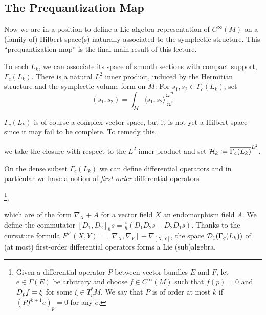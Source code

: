 \documentclass[parskip=half]{scrartcl}
\begin{document}
\subsection{The Prequantization Map}

Now we are in a position to define a Lie algebra representation of $C^\infty(M)$ on a (family of) Hilbert space(s) naturally associated to the symplectic structure. This ``prequantization map'' is the final main result of this lecture. \begin{onboard}
To each $L_k$, we can associate its space of smooth sections with compact support, $\Gamma_c(L_k)$. There is a natural $L^2$ inner product, induced by the Hermitian structure and the symplectic volume form on $M$: For $s_1,s_2\in\Gamma_c(L_k)$, set
\begin{equation*}
	(s_1,s_2)=\int_M \langle s_1,s_2\rangle \frac{\omega^n}{n!}
\end{equation*}
\end{onboard}
$\Gamma_c(L_k)$ is of course a complex vector space, but it is not yet a Hilbert space since it may fail to be complete. To remedy this, 
\begin{onboard}
we take the closure with respect to the $L^2$-inner product and set $\mathcal{H}_k\coloneqq \overline{\Gamma_c(L_k)}^{L^2}$.
	
On the dense subset $\Gamma_c(L_k)$ we can define differential operators and in particular we have a notion of \emph{first order} differential operators
\end{onboard} 
\footnote{Given a differential operator $P$ between vector bundles $E$ and $F$, let $e\in \Gamma(E)$ be arbitrary and choose $f\in C^\infty(M)$ such that $f(p)=0$ and $D_p f=\xi$ for some $\xi\in T^*_pM$. We say that $P$ is of order at most $k$ if $(P f^{k+1}e)_p= 0$ for any $e$.}, 
\begin{onboard}
which are of the form $\nabla_X+A$ for a vector field $X$ an endomorphism field $A$. We define the commutator $[D_1,D_2]_\hbar s=\frac{i}{\hbar}(D_1D_2s-D_2D_1s)$. Thanks to the curvature formula $F^\nabla(X,Y)=[\nabla_X,\nabla_Y]-\nabla_{[X,Y]}$, the space $\mathcal{D}_1(\Gamma_c(L_k))$ of (at most) first-order differential operators forms a Lie (sub)algebra.
\end{onboard}
\end{document}
